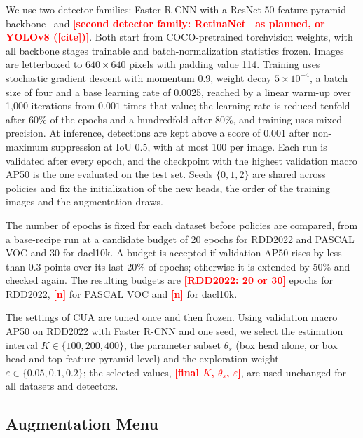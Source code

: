 \documentclass[conference]{IEEEtran}
\newcommand{\todo}[1]{\textcolor{red}{\textbf{[#1]}}}
\begin{document}
We use two detector families: Faster R-CNN with a ResNet-50 feature pyramid backbone~\cite{ren2017faster} and \todo{second detector family: RetinaNet~\cite{lin2017focal} as planned, or YOLOv8 (\todo{cite})}. Both start from COCO-pretrained torchvision weights, with all backbone stages trainable and batch-normalization statistics frozen. Images are letterboxed to $640\times640$ pixels with padding value 114. Training uses stochastic gradient descent with momentum 0.9, weight decay $5\times10^{-4}$, a batch size of four and a base learning rate of 0.0025, reached by a linear warm-up over 1,000 iterations from $0.001$ times that value; the learning rate is reduced tenfold after 60\% of the epochs and a hundredfold after 80\%, and training uses mixed precision. At inference, detections are kept above a score of 0.001 after non-maximum suppression at IoU 0.5, with at most 100 per image. Each run is validated after every epoch, and the checkpoint with the highest validation macro AP50 is the one evaluated on the test set. Seeds $\{0,1,2\}$ are shared across policies and fix the initialization of the new heads, the order of the training images and the augmentation draws.

The number of epochs is fixed for each dataset before policies are compared, from a base-recipe run at a candidate budget of 20 epochs for RDD2022 and PASCAL VOC and 30 for dacl10k. A budget is accepted if validation AP50 rises by less than 0.3 points over its last 20\% of epochs; otherwise it is extended by 50\% and checked again. The resulting budgets are \todo{RDD2022: 20 or 30} epochs for RDD2022, \todo{n} for PASCAL VOC and \todo{n} for dacl10k.

The settings of CUA are tuned once and then frozen. Using validation macro AP50 on RDD2022 with Faster R-CNN and one seed, we select the estimation interval $K\in\{100,200,400\}$, the parameter subset $\theta_s$ (box head alone, or box head and top feature-pyramid level) and the exploration weight $\varepsilon\in\{0.05,0.1,0.2\}$; the selected values, \todo{final $K$, $\theta_s$, $\varepsilon$}, are used unchanged for all datasets and detectors.

\subsection{Augmentation Menu}
\label{sec:setup_menu}
\end{document}
